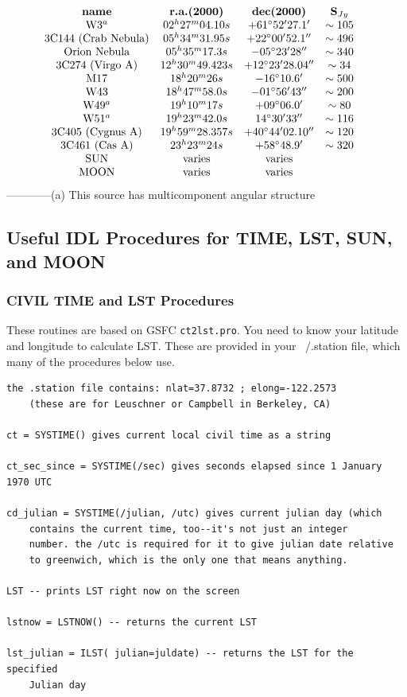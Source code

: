 \documentclass[11pt,preprint]{aastex}
\begin{document}
$$\vbox{\halign{ \hfil#\hfil\ \ & \hfil#\hfil\ \ & \hfil#\hfil\ \ &    
\hfil#\hfil\ \ \ \cr

{\bf name} & {\bf r.a.(2000)} & {\bf dec(2000)} & {\bf S$_{Jy}$} \cr

W3$^a$              & $02^h 27^m 04.10s$ &$+61^\circ 52' 27.1'$ & $\sim 105$ \cr
3C144 (Crab Nebula) & $05^h 34^m 31.95s$ &$+22^\circ 00' 52.1''$ & $\sim 496$ \cr
Orion Nebula        & $05^h 35^m 17.3s$ & $-05^\circ 23' 28''$ & $\sim 340$ \cr
3C274 (Virgo A)     & $12^h 30^m 49.423s$ & $+12^\circ 23' 28.04''$ & $\sim 34$ \cr
M17                 & $18^h 20^m 26s$ & $-16^\circ 10.6'$ & $\sim 500$ \cr
W43                 & $18^h 47^m 58.0s$ & $-01^\circ 56' 43''$ & $\sim 200$ \cr
W49$^a$             & $19^h 10^m 17s$ & $+09^\circ 06.0'$ & $\sim 80$ \cr
W51$^a$             & $19^h 23^m 42.0s$ & $14^\circ 30' 33''$ & $\sim 116$ \cr
3C405 (Cygnus A)    & $19^h 59^m 28.357s$ & $+40^\circ 44' 02.10''$ & $\sim 120$ \cr  
3C461 (Cas A)       & $23^h 23^m 24s$ & $+58^\circ 48.9'$ & $\sim 320$ \cr 
SUN                 &   varies       &   varies \cr
MOON                &   varies       &   varies \cr
}}$$
\noindent------------(a) This source has multicomponent angular structure

\subsection{Useful IDL Procedures for TIME, LST, SUN, and MOON}

\subsubsection{CIVIL TIME and LST Procedures}
These routines are based on GSFC {\tt ct2lst.pro}. You need to know your
latitude and longitude to calculate LST. These are provided in your
~/.station file, which many of the procedures below use. 
\begin{verbatim}
the .station file contains: nlat=37.8732 ; elong=-122.2573
	(these are for Leuschner or Campbell in Berkeley, CA)

ct = SYSTIME() gives current local civil time as a string

ct_sec_since = SYSTIME(/sec) gives seconds elapsed since 1 January 1970 UTC

cd_julian = SYSTIME(/julian, /utc) gives current julian day (which
	contains the current time, too--it's not just an integer
	number. the /utc is required for it to give julian date relative
	to greenwich, which is the only one that means anything.

LST -- prints LST right now on the screen

lstnow = LSTNOW() -- returns the current LST

lst_julian = ILST( julian=juldate) -- returns the LST for the specified 
	Julian day


\end{verbatim}
\end{document}

